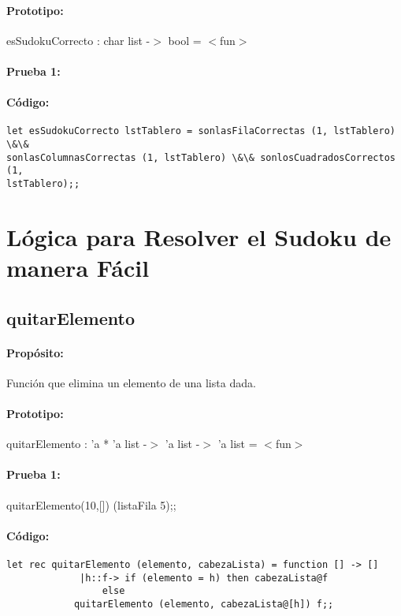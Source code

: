 \paragraph{Prototipo:} esSudokuCorrecto : char list -$>$ bool = $<$fun$>$
\paragraph{Prueba 1:}
\paragraph{Código:}
\begin{verbatim}
let esSudokuCorrecto lstTablero = sonlasFilaCorrectas (1, lstTablero) \&\&
sonlasColumnasCorrectas (1, lstTablero) \&\& sonlosCuadradosCorrectos (1,
lstTablero);;
\end{verbatim}

\section{Lógica para Resolver el Sudoku de manera F\'acil}

\subsection{quitarElemento}

\paragraph{Propósito:} Función que elimina un elemento de una lista dada.
\paragraph{Prototipo:} quitarElemento : 'a * 'a list -$>$ 'a list -$>$ 'a list = $<$fun$>$
\paragraph{Prueba 1:} quitarElemento(10,[]) (listaFila 5);;
\paragraph{Código:}
\begin{verbatim}
let rec quitarElemento (elemento, cabezaLista) = function [] -> []
			 |h::f-> if (elemento = h) then cabezaLista@f
				 else
			quitarElemento (elemento, cabezaLista@[h]) f;;
\end{verbatim}

